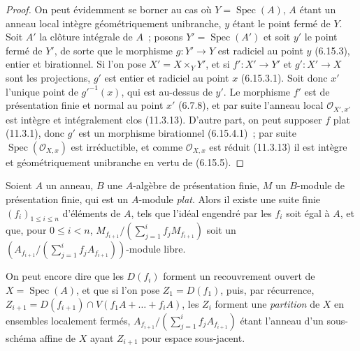 \begin{proof}
On peut évidemment se borner au cas où $Y=\operatorname{Spec}(A)$, $A$ étant
un anneau local intègre géométriquement unibranche, $y$ étant le point fermé de
$Y$. Soit $A'$ la clôture intégrale de $A$~; posons
$Y'=\operatorname{Spec}(A')$ et soit $y'$ le point fermé de $Y'$, de sorte que
le morphisme $g:Y'\to Y$ est radiciel au point $y$ (6.15.3), entier et
birationnel. Si l'on pose $X'=X\times_Y Y'$, et si $f':X'\to Y'$ et
$g':X'\to X$ sont les projections, $g'$ est entier et radiciel au point $x$
(6.15.3.1). Soit donc $x'$ l'unique point de $g'^{-1}(x)$, qui est au-dessus
de $y'$. Le morphisme $f'$ est de présentation finie et normal au point $x'$
(6.7.8), et par suite l'anneau local $\mathcal O_{X',x'}$ est intègre et
intégralement clos (11.3.13). D'autre part, on peut supposer $f$ plat (11.3.1),
donc $g'$ est un morphisme birationnel (6.15.4.1)~; par suite
$\operatorname{Spec}(\mathcal O_{X,x})$ est irréductible, et comme
$\mathcal O_{X,x}$ est réduit (11.3.13) il est intègre et géométriquement
unibranche en vertu de (6.15.5).
\end{proof}

\begin{proposition}[11.3.15]
\label{IV.11.3.15-fr}
Soient $A$ un anneau, $B$ une $A$-algèbre de présentation finie, $M$ un
$B$-module de présentation finie, qui est un $A$-module \emph{plat}. Alors il existe
une suite finie $(f_i)_{1\leq i\leq n}$ d'éléments de $A$, tels que l'idéal
engendré par les $f_i$ soit égal à $A$, et que, pour $0\leq i<n$,
$M_{f_{i+1}}/(\sum_{j=1}^{i}f_jM_{f_{i+1}})$
soit un
$(A_{f_{i+1}}\big/(\sum_{j=1}^{i}f_jA_{f_{i+1}}))$-module libre.
\end{proposition}

On peut encore dire que les $D(f_i)$ forment un recouvrement ouvert de
$X=\operatorname{Spec}(A)$, et que si l'on pose $Z_1=D(f_1)$, puis, par
récurrence, $Z_{i+1}=D(f_{i+1})\cap V(f_1A+\ldots+f_iA)$,
les $Z_i$ forment une \emph{partition} de $X$ en ensembles localement fermés,
$A_{f_{i+1}}/(\sum_{j=1}^{i}f_jA_{f_{i+1}})$ étant l'anneau d'un sous-schéma
affine de $X$ ayant $Z_{i+1}$ pour espace sous-jacent.

